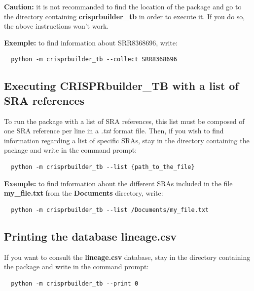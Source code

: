 \documentclass[twoside,a4paper,11pt,frenchb,openany]{report}
\begin{document}
\textbf{Caution:} it is not recommanded to find the location of the
package and go to the directory containing \textbf{crisprbuilder\_tb} in order to
execute it. If you do so, the above instructions won't work.

    \textbf{Exemple:} to find information about SRR8368696, write:

    \begin{verbatim}
  python -m crisprbuilder_tb --collect SRR8368696
\end{verbatim}


    \subsection{Executing CRISPRbuilder\_TB with a list of SRA
references}\label{executing-crisprbuilder_tb-with-a-list-of-sra-references}

    To run the package with a list of SRA references, this list must be
composed of one SRA reference per line in a \textit{.txt} format file. Then, if
you wish to find information regarding a list of specific SRAs, stay in
the directory containing the package and write in the command prompt:

    \begin{verbatim}
  python -m crisprbuilder_tb --list {path_to_the_file}
\end{verbatim}

    \textbf{Exemple:} to find information about the different SRAs included
in the file \textbf{my\_file.txt} from the \textbf{Documents} directory,
write:

    \begin{verbatim}
  python -m crisprbuilder_tb --list /Documents/my_file.txt
\end{verbatim}



    \subsection{Printing the database
lineage.csv}\label{printing-the-database-lineage.csv}

    If you want to consult the \textbf{lineage.csv} database, stay in the
directory containing the package and write in the command prompt:

    \begin{verbatim}
  python -m crisprbuilder_tb --print 0
\end{verbatim}
\end{document}
